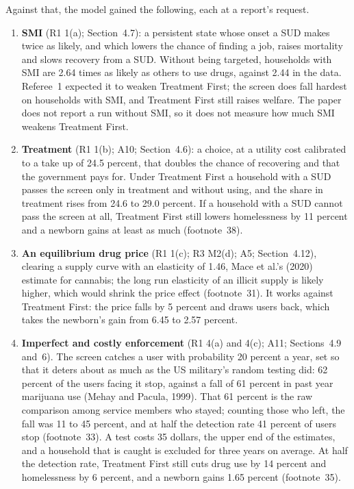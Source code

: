 \documentclass[11pt]{article}
\begin{document}
{Against that, the model gained the following, each at a report's request.
\begin{enumerate}
\item \textbf{SMI} (R1 1(a); Section~4.7): a persistent state whose onset a SUD makes twice as
likely, and which lowers the chance of finding a job, raises mortality and slows recovery from
a SUD. Without being targeted, households with SMI are 2.64 times as likely as others to use
drugs, against 2.44 in the data. Referee~1 expected it to weaken Treatment First; the screen
does fall hardest on households with SMI, and Treatment First still raises welfare. \open The
paper does not report a run without SMI, so it does not measure how much SMI weakens
Treatment First.

\item \textbf{Treatment} (R1 1(b); A10; Section~4.6): a choice, at a utility cost calibrated to
a take up of 24.5 percent, that doubles the chance of recovering and that the government pays
for. Under Treatment First a household with a SUD passes the screen only in treatment and
without using, and the share in treatment rises from 24.6 to 29.0 percent. If a household
with a SUD cannot pass the screen at all, Treatment First still lowers homelessness by 11
percent and a newborn gains at least as much (footnote~38).

\item \textbf{An equilibrium drug price} (R1 1(c); R3 M2(d); A5; Section~4.12), clearing a
supply curve with an elasticity of 1.46, Mace et al.'s (2020) estimate for cannabis; the
long run elasticity of an illicit supply is likely higher, which would shrink the price
effect (footnote~31). It works against Treatment First: the price falls by 5 percent and
draws users back, which takes the newborn's gain from 6.45 to 2.57 percent.

\item \textbf{Imperfect and costly enforcement} (R1 4(a) and 4(c); A11; Sections~4.9 and~6).
The screen catches a user with probability 20 percent a year, set so that it deters about as
much as the US military's random testing did: 62 percent of the users facing it stop, against
a fall of 61 percent in past year marijuana use (Mehay and Pacula, 1999). That 61 percent is
the raw comparison among service members who stayed; counting those who left, the fall was 11
to 45 percent, and at half the detection rate 41 percent of users stop (footnote~33). A test
costs 35 dollars, the upper end of the estimates, and a household that is caught is excluded
for three years on average. At half the detection rate, Treatment First still cuts drug use
by 14 percent and homelessness by 6 percent, and a newborn gains 1.65 percent (footnote~35).


\end{enumerate}}
\end{document}
